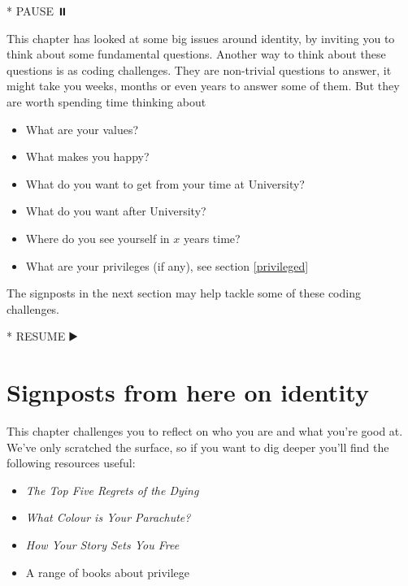 \documentclass[
]{book}
\newenvironment{Shaded}{\begin{snugshade}}{\end{snugshade}}
\newcommand{\NormalTok}[1]{#1}
\newcommand{\SpecialStringTok}[1]{\textcolor[rgb]{0.31,0.60,0.02}{#1}}
\providecommand{\tightlist}{%
  \setlength{\itemsep}{0pt}\setlength{\parskip}{0pt}}
\begin{document}
\begin{Shaded}
\begin{Highlighting}[]
\SpecialStringTok{* }\NormalTok{PAUSE ⏸️}
\end{Highlighting}
\end{Shaded}

This chapter has looked at some big issues around identity, by inviting you to think about some fundamental questions. Another way to think about these questions is as coding challenges. They are non-trivial questions to answer, it might take you weeks, months or even years to answer some of them. But they are worth spending time thinking about

\begin{itemize}
\tightlist
\item
  What are your values?
\item
  What makes you happy?
\item
  What do you want to get from your time at University?
\item
  What do you want after University?
\item
  Where do you see yourself in \(x\) years time?
\item
  What are your privileges (if any), see section \ref{privileged}
\end{itemize}

The signposts in the next section may help tackle some of these coding challenges.

\begin{Shaded}
\begin{Highlighting}[]
\SpecialStringTok{* }\NormalTok{RESUME ▶️}
\end{Highlighting}
\end{Shaded}

\hypertarget{sign2}{%
\section{Signposts from here on identity}\label{sign2}}

This chapter challenges you to reflect on who you are and what you're good at. We've only scratched the surface, so if you want to dig deeper you'll find the following resources useful:

\begin{itemize}
\tightlist
\item
  \emph{The Top Five Regrets of the Dying}
\item
  \emph{What Colour is Your Parachute?}
\item
  \emph{How Your Story Sets You Free}
\item
  A range of books about privilege
\end{itemize}
\end{document}
